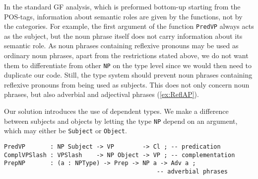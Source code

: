 \documentclass[runningheads,a4paper]{llncs}
\begin{document}

In the standard GF analysis, which is preformed bottom-up starting from the
POS-tags, information about semantic roles are given by the functions, not by the
categories. For example, the first argument of the function 
\verb-PredVP- always acts as the subject, but the noun phrase itself does not carry
information about its semantic role.
As noun phrases containing reflexive pronouns may be used as ordinary
noun phrases, apart from the restrictions stated above,
we do not want them to differentiate
from other \verb-NP- on the type level since we would then need to duplicate
our code.
Still, the type system should prevent noun phrases containing reflexive
pronouns from being used as subjects.
This does not only concern noun phrases, but also adverbial and adjectival phrases 
(\ref{ex:ReflAP}).

Our solution introduces the use of dependent types.
We make a difference between subjects and objects
by letting the type \verb-NP- depend on an argument, 
which may either be \verb-Subject- or
\verb-Object-.
\begin{verbatim}
PredVP       : NP Subject -> VP        -> Cl ; -- predication
ComplVPSlash : VPSlash    -> NP Object -> VP ; -- complementation
PrepNP       : (a : NPType) -> Prep -> NP a -> Adv a ; 
                                           -- adverbial phrases 
\end{verbatim}
\end{document}
